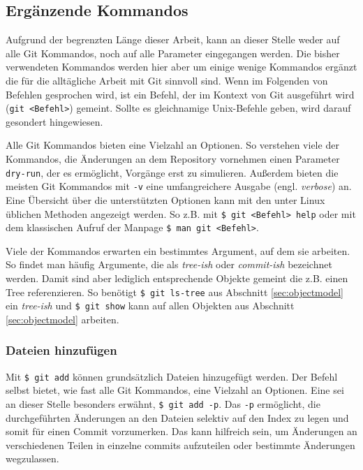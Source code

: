 \subsection{Ergänzende Kommandos}\label{sec:commands}
Aufgrund der begrenzten Länge dieser Arbeit, kann an dieser Stelle weder auf
alle Git Kommandos, noch auf alle Parameter eingegangen werden. Die bisher
verwendeten Kommandos werden hier aber um einige wenige Kommandos ergänzt die
für die alltägliche Arbeit mit Git sinnvoll sind. Wenn im Folgenden von
Befehlen gesprochen wird, ist ein Befehl, der im Kontext von Git ausgeführt
wird (\texttt{git <Befehl>}) gemeint. Sollte es gleichnamige Unix-Befehle
geben, wird darauf gesondert hingewiesen.

Alle Git Kommandos bieten eine Vielzahl an Optionen. So verstehen viele der
Kommandos, die Änderungen an dem Repository vornehmen einen Parameter
\texttt{\-{}\-{}dry-run}, der es ermöglicht, Vorgänge erst zu simulieren.
Außerdem bieten die meisten Git Kommandos mit \texttt{-v} eine umfangreichere
Ausgabe (engl. \textit{verbose}) an. Eine Übersicht über die unterstützten
Optionen kann mit den unter Linux üblichen Methoden angezeigt werden. So z.B.
mit \texttt{\$ git <Befehl> help} oder mit dem klassischen Aufruf der Manpage
\texttt{\$ man git <Befehl>}.

Viele der Kommandos erwarten ein bestimmtes Argument, auf dem sie arbeiten. So
findet man häufig Argumente, die als \textit{tree-ish} oder \textit{commit-ish}
bezeichnet werden. Damit sind aber lediglich entsprechende Objekte gemeint die
z.B. einen Tree referenzieren.\cite[52]{gitosp} So benötigt \texttt{\$ git
ls-tree} aus Abschnitt \ref{sec:objectmodel} ein \textit{tree-ish} und
\texttt{\$ git show} kann auf allen Objekten aus Abschnitt
\ref{sec:objectmodel} arbeiten.

\subsubsection{Dateien hinzufügen}\label{sec:gitadd}
Mit \texttt{\$ git add} können grundsätzlich Dateien hinzugefügt werden. Der
Befehl selbst bietet, wie fast alle Git Kommandos, eine Vielzahl an Optionen.
Eine sei an dieser Stelle besonders erwähnt, \texttt{\$ git add -p}. Das
\texttt{-p} ermöglicht, die durchgeführten Änderungen an den Dateien selektiv
auf den Index zu legen und somit für einen Commit vorzumerken. Das kann
hilfreich sein, um Änderungen an verschiedenen Teilen in einzelne
\glspl{commit} aufzuteilen oder bestimmte Änderungen
wegzulassen.\cite[S.~36-37]{gitosp}

